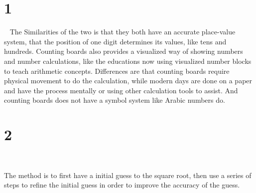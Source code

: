 \documentclass{article}
\begin{document}
\section*{1}
~
The Similarities of the two is that they both have an accurate place-value system, that the position of one digit determines its values, like tens and hundreds. Counting boards also provides a visualized way of showing numbers and number calculations, like the educations now using visualized number blocks to teach arithmetic concepts. Differences are that counting boards require physical movement to do the calculation, while modern days are done on a paper and have the process mentally or using other calculation tools to assist. And counting boards does not have a symbol system like Arabic numbers do.

\newpage

\section*{2}

~

The method is to first have a initial guess to the square root, then use a series of steps to refine the initial guess in order to improve the accuracy of the guess.
\end{document}

